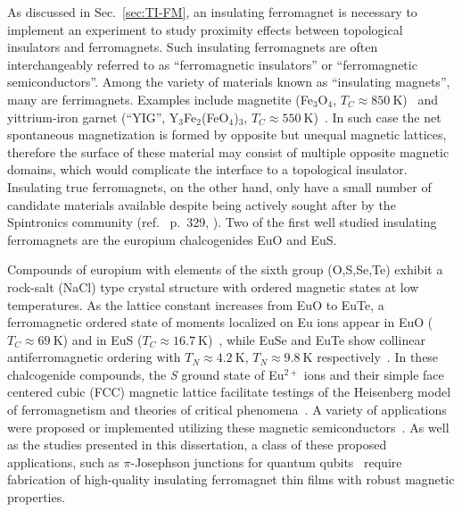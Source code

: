 As discussed in Sec.~\ref{sec:TI-FM}, an insulating ferromagnet is necessary to implement an experiment to study proximity effects between topological insulators and ferromagnets. Such insulating ferromagnets are often interchangeably referred to as ``ferromagnetic insulators'' or ``ferromagnetic semiconductors''. Among the variety of materials known as ``insulating magnets'', many are ferrimagnets. Examples include magnetite (Fe$_3$O$_4$, $T_C\approx850~\mathrm{K}$)~\cite{Neel1948} and yittrium-iron garnet (``YIG'', Y$_3$Fe$_2$(FeO$_4$)$_3$, $T_C\approx550~\mathrm{K}$)~\cite{YIG}. In such case the net spontaneous magnetization is formed by opposite but unequal magnetic lattices, therefore the surface of these material may consist of multiple opposite magnetic domains, which would complicate the interface to a topological insulator. Insulating true ferromagnets, on the other hand, only have a small number of candidate materials available despite being actively sought after by the Spintronics community (ref.~\cite{kittel} p.~329, \cite{Yi2014, Wolf2001}). Two of the first well studied insulating ferromagnets are the europium chalcogenides EuO and EuS.

Compounds of europium with elements of the sixth group (O,S,Se,Te) exhibit a rock-salt (NaCl) type crystal structure with ordered magnetic states at low temperatures. As the lattice constant increases from EuO to EuTe, a ferromagnetic ordered state of moments localized on Eu ions appear in EuO ($T_C\approx69~\mathrm{K}$) and in EuS ($T_C\approx16.7~\mathrm{K}$)~\cite{EuO_TC, EuS_Shafer}, while EuSe and EuTe show collinear antiferromagnetic ordering with $T_N\approx4.2~\mathrm{K}$, $T_N\approx9.8~\mathrm{K}$ respectively~\cite{EuSe_AF, EuTe_AF}. In these chalcogenide compounds, the \textit{S} ground state of Eu$^{2+}$ ions and their simple face centered cubic (FCC) magnetic lattice facilitate testings of the Heisenberg model of ferromagnetism and theories of critical phenomena~\cite{divalent_Eu,  EuS_neighbor_exchange, EuS_critical, EuS_neutron, EuS_spin_wave}. A variety of applications were proposed or implemented utilizing these magnetic semiconductors~\cite{EuS_spin_filter, EuS_app1, EuS_spin_filter2}. As well as the studies presented in this dissertation, a class of these proposed applications, such as $\pi$-Josephson junctions for quantum qubits~\cite{pi_qubit, pi_junction, Jing} require fabrication of high-quality insulating ferromagnet thin films with robust magnetic properties.

